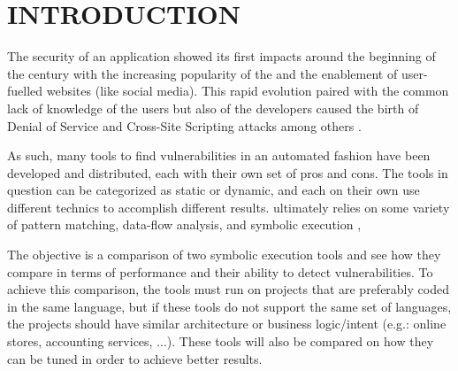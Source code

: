 
\section{INTRODUCTION} \label{chap:intro}
The security of an application showed its first impacts around the beginning of the century with the increasing popularity of the  and the enablement of user-fuelled websites (like social media). This rapid evolution paired with the common lack of knowledge of the users but also of the developers caused the birth of Denial of Service and Cross-Site Scripting attacks among others \cite{Hoffman2024}.



As such, many tools to find vulnerabilities in an automated fashion have been developed and distributed, each with their own set of pros and cons. The tools in question can be categorized as static or dynamic, and each on their own use different technics to accomplish different results.  ultimately relies on some variety of pattern matching, data-flow analysis, and symbolic execution \cite{Croft2021},%

The objective is a comparison of two symbolic execution tools and see how they compare in terms of performance and their ability to detect vulnerabilities. To achieve this comparison, the tools must run on projects that are preferably coded in the same language, but if these tools do not support the same set of languages, the projects should have similar architecture or business logic/intent (e.g.: online stores, accounting services, ...). These tools will also be compared on how they can be tuned in order to achieve better results.

